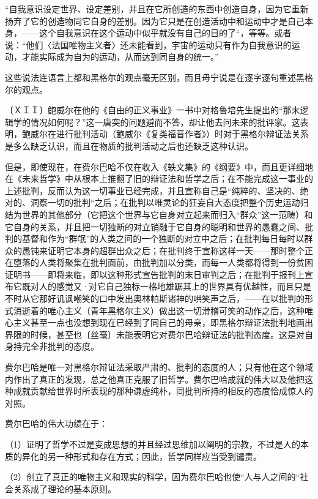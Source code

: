 \documentclass[a4paper,twoside,12pt,AutoFakeBold]{ctexart}
\begin{document}
\begin{fangsong}
“自我意识设定世界、设定差别，并且在它所创造的东西中创造自身，因为它重新扬弃了它的创造物同它自身的差别。因为它只是在创造活动中和运动中才是自己本身，——这个自我意识在这个运动中似乎就没有自己的目的了“，等等。或者说：“他们〈法国唯物主义者〉还未能看到，宇宙的运动只有作为自我意识的运动，才能实际成为自为的运动，从而达到同自身的统一。”    
\end{fangsong}

这些说法连语言上都和黑格尔的观点毫无区别，而且毋宁说是在逐字逐句重述黑格尔的观点。

〔ＸＩＩ〕鲍威尔在他的《自由的正义事业》一书中对格鲁培先生提出的“那末逻辑学的情况如何呢？”这一唐突的问题避而不答，却让他去问未来的批评家。这表明，鲍威尔在进行批判活动（鲍威尔《复类福音作者》）时对于黑格尔辩证法关系是多么缺乏认识，而且在物质的批判活动之后也还缺乏这种认识。

但是，即使现在，在费尔巴哈不仅在收入《轶文集》的《纲要》中，而且更详细地在《未来哲学》中从根本上推翻了旧的辩证法和哲学之后；在不能完成这一事业的上述批判，反而认为这一切事业已经完成，并且宣称自己是“纯粹的、坚决的、绝对的、洞察一切的批判“之后；在批判以唯灵论的狂妄自大态度把整个历史运动归结为世界的其他部分（它把这个世界与它自身对立起来而归入“群众”这一范畴）和它自身的关系，并且把一切独断的对立销融于它自身的聪明和世界的愚蠢之间、批判的基督和作为“群氓”的人类之间的一个独断的对立中之后；在批判每日每时以群众的愚钝来证明它本身的超群出众之后；在批判终于宣称这样一天——那时整个正在堕落的人类将聚集在批判面前，由批判加以分类，而每一人类都将得到一份贫困证明书——即将来临，即以这种形式宣告批判的末日审判之后；在批判于报刊上宣布它既对人的感觉又·对它自己独标一格地雄踞其上的世界具有优越性，而且只是不时从它那好讥讽嘲笑的口中发出奥林帕斯诸神的哄笑声之后，——在以批判的形式消逝着的唯心主义（青年黑格尔主义）做出这一切滑稽可笑的动作之后，这种唯心主义甚至一点也没想到现在已经到了同自己的母亲，即黑格尔辩证法批判地画出界限的时候，甚至也〔丝毫〕未能表明它对费尔巴哈辩证法的批判态度。这是对自身持完全非批判的态度。

费尔巴哈是唯一对黑格尔辩证法采取严肃的、批判的态度的人；只有他在这个领域内作出了真正的发现，总之他真正克服了旧哲学。费尔巴哈成就的伟大以及他把这种成就贡献给世界时所表现的那种谦虚纯朴，同批判所持的相反的态度恰成惊人的对照。

费尔巴哈的伟大功绩在于：

（1）证明了哲学不过是变成思想的并且经过思维加以阐明的宗教，不过是人的本质的异化的另一种形式和存在方式；因此，哲学同样应当受到谴责。

（2）创立了真正的唯物主义和现实的科学，因为费尔巴哈也使“人与人之间的“社会关系成了理论的基本原则。
\end{document}
